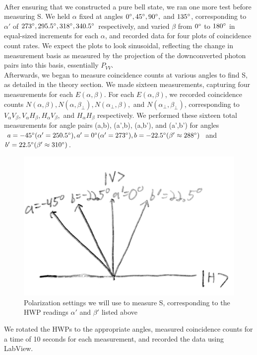 \documentclass{article}
\begin{document}
    \\\indent After ensuring that we constructed a pure bell state, we ran one more test before measuring S. We held $\alpha$ fixed at angles $0\degree, 45\degree,90\degree,$ and $135\degree$, corresponding to $\alpha'$ of $273\degree,295.5\degree,318\degree,340.5\degree$ respectively, and varied $\beta$ from $0\degree$ to $180\degree$ in equal-sized increments for each $\alpha$, and recorded data for four plots of coincidence count rates. We expect the plots to look sinusoidal, reflecting the change in measurement basis as measured by the projection of the downconverted photon pairs into this basis, essentially $P_{VV}$.  
    \\\indent Afterwards, we began to measure coincidence counts at various angles to find S, as detailed in the theory section. We made sixteen measurements, capturing four measurements for each $E(\alpha,\beta)$. For each $E(\alpha,\beta)$, we recorded coincidence counts $N(\alpha,\beta), N(\alpha,\beta_\bot), N(\alpha_\bot,\beta),$ and $N(\alpha_\bot,\beta_\bot)$, corresponding to $V_\alpha V_\beta, V_\alpha H_\beta, H_\alpha V_\beta,$ and $H_\alpha H_\beta$ respectively. We performed these sixteen total measurements for angle pairs (a,b), (a',b), (a,b'), and (a',b') for angles $a = -45\degree (\alpha' = 250.5\degree), a' = 0\degree (\alpha' = 273\degree), b = -22.5\degree (\beta' \approx 288 \degree)$ and $b' = 22.5\degree (\beta' \approx 310\degree)$.
    \begin{figure}[H] %
    \centering
    \includegraphics[scale = 0.15]{5.JPG}
    \caption{Polarization settings we will use to measure S, corresponding to the HWP readings $\alpha'$ and $\beta'$ listed above}
    \label{fig:my_label}
\end{figure}
    We rotated the HWPs to the appropriate angles, measured coincidence counts for a time of 10 seconds for each measurement, and recorded the data using LabView.
   
\end{document}

